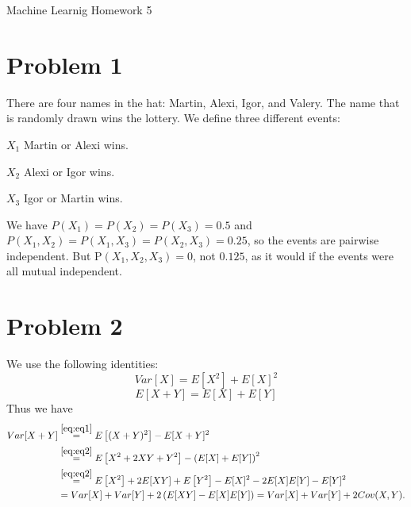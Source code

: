 \documentclass[12pt]{article}
\begin{document}
\begin{center}
{\Large Machine Learnig Homework 5} \\[.3in]
\end{center}
\vspace*{.5in}


\section*{Problem 1}

There are four names in the hat: Martin, Alexi, Igor, and Valery. The name that is randomly drawn wins the lottery. We define three different events:
\begin{description}
 \item{$X_1$} Martin or Alexi wins.
 \item {$X_2$} Alexi or Igor wins.
 \item {$X_3$} Igor or Martin wins.
\end{description}

We have $P(X_1) = P(X_2) = P(X_3) = 0.5$ and $P(X_1, X_2) = P(X_1, X_3) = P(X_2, X_3) = 0.25$, so the events are pairwise independent. But P$(X_1, X_2, X_3) = 0$, not $0.125$, as it would if the events were all mutual independent.


\section*{Problem 2}

We use the following identities:\\
\begin{equation}
Var[X] = E[X^2] + E[X]^2\label{eq:eq1}
\end{equation}
\begin{equation}
E[X+Y] = E[X]+E[Y]\label{eq:eq2}
\end{equation}
Thus we have\\
\begin{align*}
\begin{split}
Var[X+Y] &\stackrel{\eqref{eq:eq1}}{=} E\left[(X+Y)^2\right]-E[X+Y]^2\\
&\stackrel{\eqref{eq:eq2}}{=}E\left[X^2+2XY+Y^2\right] -\left(E[X]+E[Y]\right)^2\\
&\stackrel{\eqref{eq:eq2}}{=}E\left[X^2\right] + 2E[XY] + E\left[Y^2\right] -E[X]^2-2E[X]E[Y]-E[Y]^2\\
&=Var[X]+Var[Y] + 2\left(E[XY] - E[X]E[Y]\right) = Var[X]+Var[Y]+2Cov(X,Y).
\end{split}
\end{align*}
\end{document}
